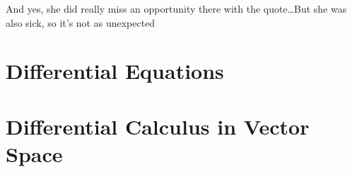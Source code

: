 \documentclass{article}
\begin{document}
And yes, she did really miss an opportunity there with the quote\dots But she was also sick, so it's not as unexpected



\newsection
\section{Differential Equations}





\section{Differential Calculus in Vector Space}


\end{document}
